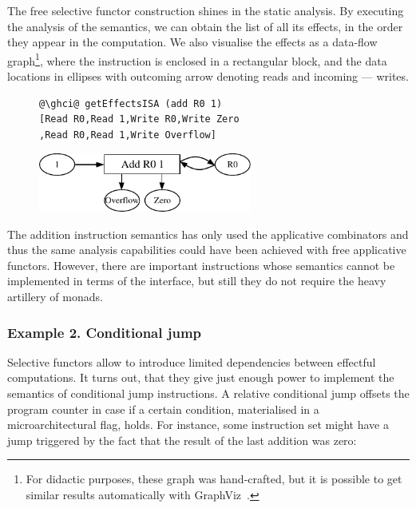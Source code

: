The free selective functor construction shines in the static analysis. By executing
the analysis of the  semantics, we can obtain the list of all its effects,
in the order they appear in the computation. We also visualise the effects as a data-flow
graph\footnote{For didactic purposes,
these graph was hand-crafted, but it is possible to get similar results automatically
with GraphViz~\cite{graphviz}.}, where the instruction is enclosed in a rectangular block,
and the data locations in ellipses with outcoming arrow denoting reads and incoming --- writes.

\begin{figure}[!h]
 \begin{minipage}{0.45\textwidth}
\raggedleft
\begin{verbatim}
@\ghci@ getEffectsISA (add R0 1)
[Read R0,Read 1,Write R0,Write Zero
,Read R0,Read 1,Write Overflow]
\end{verbatim}
 \end{minipage}
 \begin{minipage}{0.45\textwidth}
  \centering
  \includegraphics[width=7cm]{./img/ISA/add.pdf}
 \end{minipage}
\end{figure}

The addition instruction semantics has only used the applicative combinators and thus
the same analysis capabilities could have been achieved with free applicative functors.
However, there are important instructions whose semantics cannot be implemented in terms
of the  interface, but still they do not require the heavy artillery of monads.

\subsubsection{\textbf{Example 2. Conditional jump}}

Selective functors allow to introduce limited dependencies between effectful computations.
It turns out, that they give just enough power to implement the semantics of conditional
jump instructions. A relative conditional jump offsets the program counter in case if a
certain condition, materialised in a microarchitectural flag, holds. For instance, some
instruction set might have a jump triggered by the fact that the result of the last addition
was zero:

